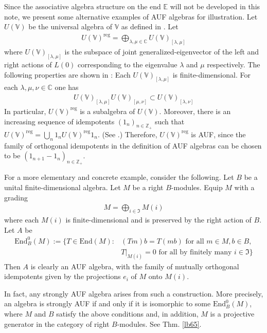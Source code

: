 \documentclass[11pt,b5paper,notitlepage]{article}
\theoremstyle{definition}
\theoremstyle{plain}
\newcommand{\fk}{\mathfrak}
\newcommand{\End}{\mathrm{End}} %
\newcommand{\Vbb}{\mathbb V}
\newcommand{\Cbb}{\mathbb C}
\newcommand{\Zbb}{\mathbb Z}
\newcommand{\Ebb}{\mathbb E}
\numberwithin{equation}{section}
\begin{document}
Since the associative algebra structure on the end $\Ebb$ will not be developed in this note, we present some alternative examples of AUF algebras for illustration. Let $U(\Vbb)$ be the universal algebra of $\Vbb$ as defined in \cite{FZ92-universal-alg}. Let
\begin{align*}
U(\Vbb)^{\mathrm{reg}}=\bigoplus_{\lambda,\mu\in\Cbb}U(\Vbb)_{[\lambda,\mu]}
\end{align*}
where $U(\Vbb)_{[\lambda,\mu]}$ is the subspace of joint generalized-eigenvector of the left and right actions of $L(0)$ corresponding to the eigenvalue $\lambda$ and $\mu$ respectively. The following properties are shown in \cite{MNT10}: Each $U(\Vbb)_{[\lambda,\mu]}$ is finite-dimensional. For each $\lambda,\mu,\nu\in\Cbb$ one has
\begin{align*}
U(\Vbb)_{[\lambda,\mu]}U(\Vbb)_{[\mu,\nu]}\subset U(\Vbb)_{[\lambda,\nu]}
\end{align*}
In particular, $U(\Vbb)^{\mathrm{reg}}$ is a subalgebra of $U(\Vbb)$. Moreover, there is an increasing sequence of idempotents $(1_n)_{n\in\Zbb_+}$ such that $U(\Vbb)^{\mathrm{reg}}=\bigcup_n1_nU(\Vbb)^{\mathrm{reg}}1_n$. (See \cite[Sec. 2.6]{MNT10}.) Therefore, $U(\Vbb)^{\mathrm{reg}}$ is AUF, since the family of orthogonal idempotents in the definition of AUF algebras can be chosen to be $(1_{n+1}-1_n)_{n\in\Zbb_+}$.


For a more elementary and concrete example, consider the following. Let $B$ be a unital finite-dimensional algebra. Let $M$ be a right $B$-modules. Equip $M$ with a grading
\begin{align*}
M=\bigoplus_{i\in\fk I}M(i)
\end{align*}
where each $M(i)$ is finite-dimensional and is preserved by the right action of $B$. Let $A$ be
\begin{align*}
\End^0_B(M):=\{T\in\End(M):&(Tm)b=T(mb)\text{ for all $m\in M,b\in B$,}\\
&T|_{M(i)}=0\text{ for all by finitely many }i\in\fk I \}
\end{align*}
Then $A$ is clearly an AUF algebra, with the family of mutually orthogonal idempotents given by the projections $e_i$ of $M$ onto $M(i)$. 

In fact, any strongly AUF algebra arises from such a construction. More precisely, an algebra is strongly AUF if and only if it is isomorphic to some $\End^0_B(M)$, where $M$ and $B$ satisfy the above conditions and, in addition, $M$ is a projective generator in the category of right $B$-modules. See Thm. \ref{lb65}.
\end{document}
